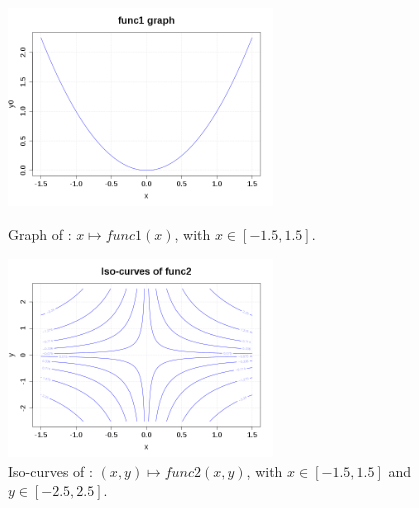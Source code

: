              \begin{figure}[H]
               \begin{minipage}{8cm}
                 \begin{center}
                   \includegraphics[width=7cm]{Figures/NMFgraph3.png}
                   \caption{Graph of : $ x \mapsto  func1(x)$, with $x\in [-1.5, 1.5]$.}
                   \label{graph1}
                 \end{center}
               \end{minipage}
               \hfill
               \begin{minipage}{8cm}
                 \begin{center}
                   \includegraphics[width=7cm]{Figures/NMFgraph4.png}
                   \caption{Iso-curves of : $ (x,y) \mapsto  func2(x,y)$, with  $x\in [-1.5, 1.5]$ and $y\in [-2.5, 2.5]$.}
                   \label{graph2}
                 \end{center}
               \end{minipage}
             \end{figure}

